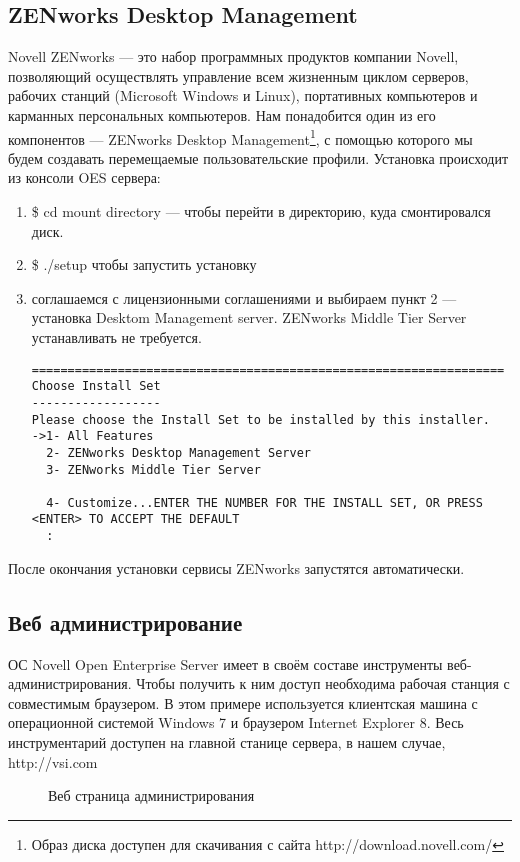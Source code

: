 \subsection{ZENworks Desktop Management}
Novell ZENworks --- это набор программных продуктов компании Novell, позволяющий осуществлять управление всем жизненным циклом серверов, рабочих станций (Microsoft Windows и Linux), портативных компьютеров и карманных персональных компьютеров. Нам понадобится один из его компонентов --- ZENworks Desktop Management\footnote{Образ диска доступен для скачивания с сайта http://download.novell.com/}, с помощью которого мы будем создавать перемещаемые пользовательские профили. Установка происходит из консоли OES сервера:
\begin{enumerate}
  \item \textsf{\$ cd} mount directory --- чтобы перейти в директорию, куда смонтировался диск.
  \item \textsf{\$ ./setup} чтобы запустить установку
  \item соглашаемся с лицензионными соглашениями и выбираем пункт 2 --- установка Desktom Management server. ZENworks Middle Tier Server устанавливать не требуется.
  \begin{verbatim}
==================================================================
Choose Install Set
------------------
Please choose the Install Set to be installed by this installer.
->1- All Features
  2- ZENworks Desktop Management Server
  3- ZENworks Middle Tier Server

  4- Customize...ENTER THE NUMBER FOR THE INSTALL SET, OR PRESS <ENTER> TO ACCEPT THE DEFAULT
  :
  \end{verbatim} 
\end{enumerate}
После окончания установки сервисы ZENworks запустятся автоматически.
\clearpage

\subsection{Веб администрирование}
ОС \foreignlanguage{english}{Novell Open Enterprise Server} имеет в своём составе инструменты веб-администрирования. Чтобы получить к ним доступ необходима рабочая станция с совместимым браузером. В этом примере используется клиентская машина с операционной системой \foreignlanguage{english}{Windows 7} и браузером \foreignlanguage{english}{Internet Explorer 8}. Весь инструментарий доступен на главной станице сервера, в нашем случае, http://vsi.com
\begin{figure}[H]
\caption{Веб страница администрирования}
\end{figure}
\clearpage

